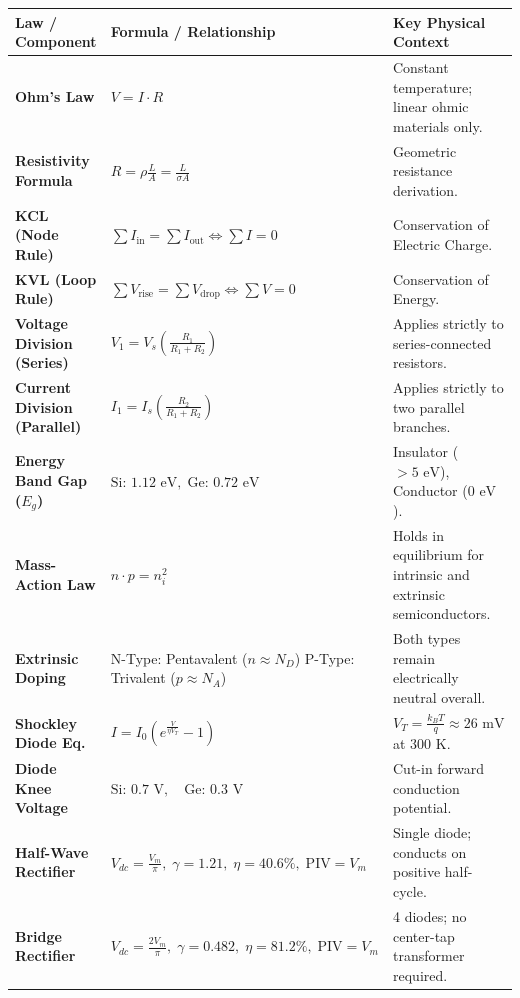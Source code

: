 \begin{table}[htbp]
\centering
\small
\begin{tabularx}{\textwidth}{llX}
\toprule
\textbf{Law / Component} & \textbf{Formula / Relationship} & \textbf{Key Physical Context} \\
\midrule
\textbf{Ohm's Law} & $V = I \cdot R$ & Constant temperature; linear ohmic materials only. \\
\textbf{Resistivity Formula} & $R = \rho \frac{L}{A} = \frac{L}{\sigma A}$ & Geometric resistance derivation. \\
\textbf{KCL (Node Rule)} & $\sum I_{\text{in}} = \sum I_{\text{out}} \iff \sum I = 0$ & Conservation of Electric Charge. \\
\textbf{KVL (Loop Rule)} & $\sum V_{\text{rise}} = \sum V_{\text{drop}} \iff \sum V = 0$ & Conservation of Energy. \\
\textbf{Voltage Division (Series)} & $V_1 = V_s \left(\frac{R_1}{R_1 + R_2}\right)$ & Applies strictly to series-connected resistors. \\
\textbf{Current Division (Parallel)} & $I_1 = I_s \left(\frac{R_2}{R_1 + R_2}\right)$ & Applies strictly to two parallel branches. \\
\textbf{Energy Band Gap ($E_g$)} & $\text{Si: } 1.12\text{ eV}, \; \text{Ge: } 0.72\text{ eV}$ & Insulator ($>5\text{ eV}$), Conductor ($0\text{ eV}$). \\
\textbf{Mass-Action Law} & $n \cdot p = n_i^2$ & Holds in equilibrium for intrinsic and extrinsic semiconductors. \\
\textbf{Extrinsic Doping} & \makecell[l]{N-Type: Pentavalent ($n \approx N_D$)\\P-Type: Trivalent ($p \approx N_A$)} & Both types remain electrically neutral overall. \\
\textbf{Shockley Diode Eq.} & $I = I_0 \left(e^{\frac{V}{\eta V_T}} - 1\right)$ & $V_T = \frac{k_B T}{q} \approx 26\text{ mV}$ at $300\text{ K}$. \\
\textbf{Diode Knee Voltage} & $\text{Si: } 0.7\text{ V}, \quad \text{Ge: } 0.3\text{ V}$ & Cut-in forward conduction potential. \\
\textbf{Half-Wave Rectifier} & $V_{dc} = \frac{V_m}{\pi}, \; \gamma = 1.21, \; \eta = 40.6\%, \; \text{PIV} = V_m$ & Single diode; conducts on positive half-cycle. \\
\textbf{Bridge Rectifier} & $V_{dc} = \frac{2V_m}{\pi}, \; \gamma = 0.482, \; \eta = 81.2\%, \; \text{PIV} = V_m$ & 4 diodes; no center-tap transformer required. \\

\end{tabularx}
\end{table}
